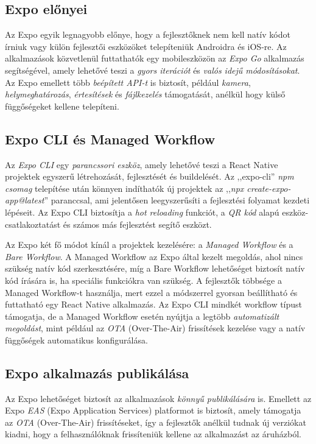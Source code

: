 \documentclass[
]{thesis-ekf}
\theoremstyle{definition}
\theoremstyle{remark}
\begin{document}
\subsection{Expo előnyei}
Az Expo egyik legnagyobb előnye, hogy a fejlesztőknek nem kell natív kódot írniuk vagy külön fejlesztői eszközöket telepíteniük Androidra és iOS-re. Az alkalmazások közvetlenül futtathatók egy mobileszközön az \emph{Expo Go} alkalmazás segítségével, amely lehetővé teszi a \emph{gyors iterációt} és \emph{valós idejű módosításokat}. Az Expo emellett több \emph{beépített API-t} is biztosít, például \emph{kamera}, \emph{helymeghatározás}, \emph{értesítések} és \emph{fájlkezelés} támogatását, anélkül hogy külső függőségeket kellene telepíteni. \cite{expoOfficial, expoBook}

\subsection{Expo CLI és Managed Workflow}
Az \emph{Expo CLI} egy \emph{parancssori eszköz}, amely lehetővé teszi a React Native projektek egyszerű létrehozását, fejlesztését és buildelését. Az ,,expo-cli'' \emph{npm csomag} telepítése után könnyen indíthatók új projektek az ,,\emph{npx create-expo-app@latest}'' paranccsal, ami jelentősen leegyszerűsíti a fejlesztési folyamat kezdeti lépéseit. Az Expo CLI biztosítja a \emph{hot reloading} funkciót, a \emph{QR kód} alapú eszköz-csatlakoztatást és számos más fejlesztést segítő eszközt.

Az Expo két fő módot kínál a projektek kezelésére: a \emph{Managed Workflow} és a \emph{Bare Workflow}. A Managed Workflow az Expo által kezelt megoldás, ahol nincs szükség natív kód szerkesztésére, míg a Bare Workflow lehetőséget biztosít natív kód írására is, ha speciális funkciókra van szükség. A fejlesztők többsége a Managed Workflow-t használja, mert ezzel a módszerrel gyorsan beállítható és futtatható egy React Native alkalmazás. Az Expo CLI mindkét workflow típust támogatja, de a Managed Workflow esetén nyújtja a legtöbb \emph{automatizált megoldást}, mint például az \emph{OTA} (Over-The-Air) frissítések kezelése vagy a natív függőségek automatikus konfigurálása. \cite{expoOfficial, expoBook}

\subsection{Expo alkalmazás publikálása}
Az Expo lehetőséget biztosít az alkalmazások \emph{könnyű publikálására} is. Emellett az Expo \emph{EAS} (Expo Application Services) platformot is biztosít, amely támogatja az \emph{OTA} (Over-The-Air) frissítéseket, így a fejlesztők anélkül tudnak új verziókat kiadni, hogy a felhasználóknak frissíteniük kellene az alkalmazást az áruházból. \cite{expoOfficial, expoBook}
\end{document}
